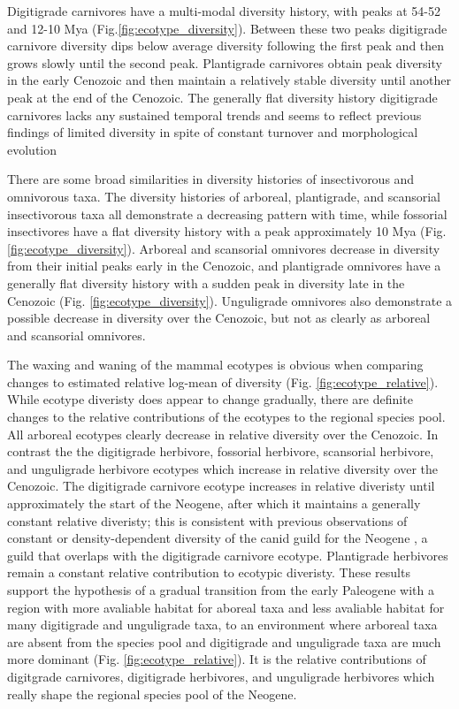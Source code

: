Digitigrade carnivores have a multi-modal diversity history, with peaks at 54-52 and 12-10 Mya (Fig.\ref{fig:ecotype_diversity}). Between these two peaks digitigrade carnivore diversity dips below average diversity following the first peak and then grows slowly until the second peak. Plantigrade carnivores obtain peak diversity in the early Cenozoic and then maintain a relatively stable diversity until another peak at the end of the Cenozoic. The generally flat diversity history digitigrade carnivores lacks any sustained temporal trends and seems to reflect previous findings of limited diversity in spite of constant turnover and morphological evolution \citep{Valkenburgh1999,Silvestro2015b,Slater2015c}

There are some broad similarities in diversity histories of insectivorous and omnivorous taxa. The diversity histories of arboreal, plantigrade, and scansorial insectivorous taxa all demonstrate a decreasing pattern with time, while fossorial insectivores have a flat diversity history with a peak approximately 10 Mya (Fig. \ref{fig:ecotype_diversity}). Arboreal and scansorial omnivores decrease in diversity from their initial peaks early in the Cenozoic, and plantigrade omnivores have a generally flat diversity history with a sudden peak in diversity late in the Cenozoic (Fig. \ref{fig:ecotype_diversity}). Unguligrade omnivores also demonstrate a possible decrease in diversity over the Cenozoic, but not as clearly as arboreal and scansorial omnivores.


The waxing and waning of the mammal ecotypes is obvious when comparing changes to estimated relative log-mean of diversity (Fig. \ref{fig:ecotype_relative}). While ecotype diveristy does appear to change gradually, there are definite changes to the relative contributions of the ecotypes to the regional species pool. All arboreal ecotypes clearly decrease in relative diversity over the Cenozoic. In contrast the the digitigrade herbivore, fossorial herbivore, scansorial herbivore, and unguligrade herbivore ecotypes which increase in relative diversity over the Cenozoic. The digitigrade carnivore ecotype increases in relative diveristy until approximately the start of the Neogene, after which it maintains a generally constant relative diveristy; this is consistent with previous observations of constant or density-dependent diversity of the canid guild for the Neogene \citep{Valkenburgh1999,Silvestro2015b,Slater2015c}, a guild that overlaps with the digitigrade carnivore ecotype. Plantigrade herbivores remain a constant relative contribution to ecotypic diveristy. These results support the hypothesis of a gradual transition from the early Paleogene with a region with more avaliable habitat for aboreal taxa and less avaliable habitat for many digitigrade and unguligrade taxa, to an environment where arboreal taxa are absent from the species pool and digitigrade and unguligrade taxa are much more dominant (Fig. \ref{fig:ecotype_relative}). It is the relative contributions of digitgrade carnivores, digitigrade herbivores, and unguligrade herbivores which really shape the regional species pool of the Neogene. 


